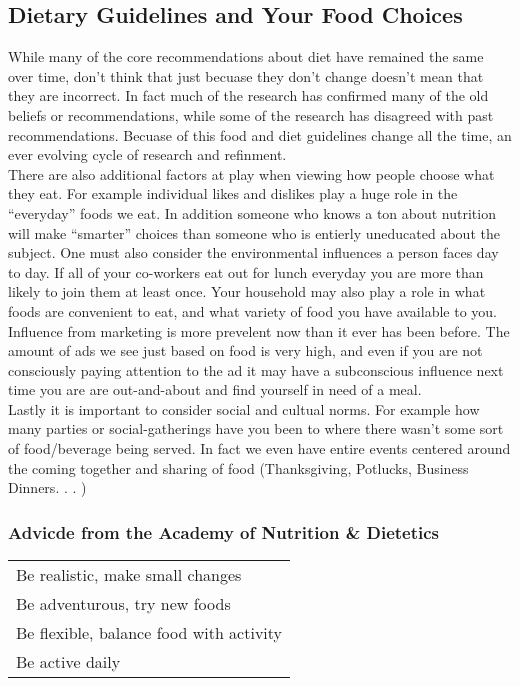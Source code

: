 \documentclass[letterpaper, 11pt]{article}
\begin{document}
\subsection{Dietary Guidelines and Your Food Choices}
\label{sec:org0fb1c61}
While many of the core recommendations about diet have remained the same over time, don't think that just becuase they don't change doesn't mean that they are incorrect. In fact much of the research has confirmed many of the old beliefs or recommendations, while some of the research has disagreed with past recommendations. Becuase of this food and diet guidelines change all the time, an ever evolving cycle of research and refinment.\\
There are also additional factors at play when viewing how people choose what they eat. For example individual likes and dislikes play a huge role in the ``everyday'' foods we eat. In addition someone who knows a ton about nutrition will make ``smarter'' choices than someone who is entierly uneducated about the subject. One must also consider the environmental influences a person faces day to day. If all of your co-workers eat out for lunch everyday you are more than likely to join them at least once. Your household may also play a role in what foods are convenient to eat, and what variety of food you have available to you.\\
Influence from marketing is more prevelent now than it ever has been before. The amount of ads we see just based on food is very high, and even if you are not consciously paying attention to the ad it may have a subconscious influence next time you are are out-and-about and find yourself in need of a meal.\\
Lastly it is important to consider social and cultual norms. For example how many parties or social-gatherings have you been to where there wasn't some sort of food/beverage being served. In fact we even have entire events centered around the coming together and sharing of food (Thanksgiving, Potlucks, Business Dinners. . . )\\
\subsubsection{Advicde from the Academy of Nutrition \& Dietetics}
\label{sec:orgc868782}
\begin{center}
\begin{tabular}{l}
Be realistic, make small changes\\
Be adventurous, try new foods\\
Be flexible, balance food with activity\\
Be active daily\\
\end{tabular}
\end{center}
\end{document}
